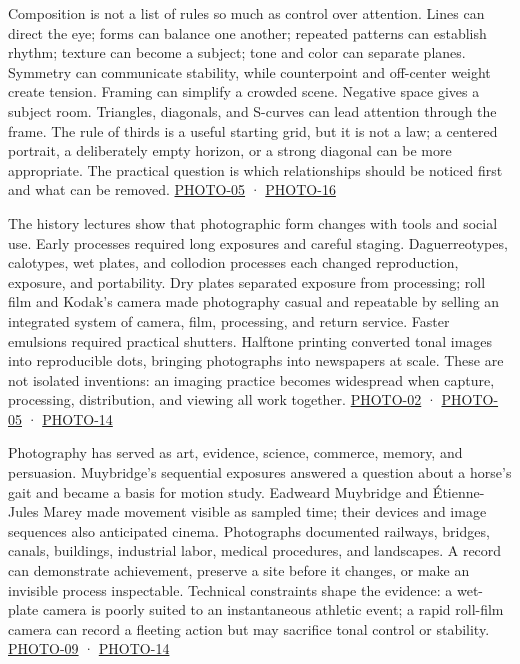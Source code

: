 \hypertarget{04-visual-computing-ii-ch034-composition-history-and-the-uses-of-photographs}{}

Composition is not a list of rules so much as control over attention. Lines can direct the eye; forms can balance one another; repeated patterns can establish rhythm; texture can become a subject; tone and color can separate planes. Symmetry can communicate stability, while counterpoint and off-center weight create tension. Framing can simplify a crowded scene. Negative space gives a subject room. Triangles, diagonals, and S-curves can lead attention through the frame. The rule of thirds is a useful starting grid, but it is not a law; a centered portrait, a deliberately empty horizon, or a strong diagonal can be more appropriate. The practical question is which relationships should be noticed first and what can be removed. \hyperref[04-visual-computing-ii-ch036-photo-05---photography-session-05]{PHOTO-05} · \hyperref[04-visual-computing-ii-ch036-photo-16---photography-session-16]{PHOTO-16}

The history lectures show that photographic form changes with tools and social use. Early processes required long exposures and careful staging. Daguerreotypes, calotypes, wet plates, and collodion processes each changed reproduction, exposure, and portability. Dry plates separated exposure from processing; roll film and Kodak's camera made photography casual and repeatable by selling an integrated system of camera, film, processing, and return service. Faster emulsions required practical shutters. Halftone printing converted tonal images into reproducible dots, bringing photographs into newspapers at scale. These are not isolated inventions: an imaging practice becomes widespread when capture, processing, distribution, and viewing all work together. \hyperref[04-visual-computing-ii-ch036-photo-02---photography-session-02]{PHOTO-02} · \hyperref[04-visual-computing-ii-ch036-photo-05---photography-session-05]{PHOTO-05} · \hyperref[04-visual-computing-ii-ch036-photo-14---photography-session-14]{PHOTO-14}

Photography has served as art, evidence, science, commerce, memory, and persuasion. Muybridge's sequential exposures answered a question about a horse's gait and became a basis for motion study. Eadweard Muybridge and Étienne-Jules Marey made movement visible as sampled time; their devices and image sequences also anticipated cinema. Photographs documented railways, bridges, canals, buildings, industrial labor, medical procedures, and landscapes. A record can demonstrate achievement, preserve a site before it changes, or make an invisible process inspectable. Technical constraints shape the evidence: a wet-plate camera is poorly suited to an instantaneous athletic event; a rapid roll-film camera can record a fleeting action but may sacrifice tonal control or stability. \hyperref[04-visual-computing-ii-ch036-photo-09---photography-session-09]{PHOTO-09} · \hyperref[04-visual-computing-ii-ch036-photo-14---photography-session-14]{PHOTO-14}

